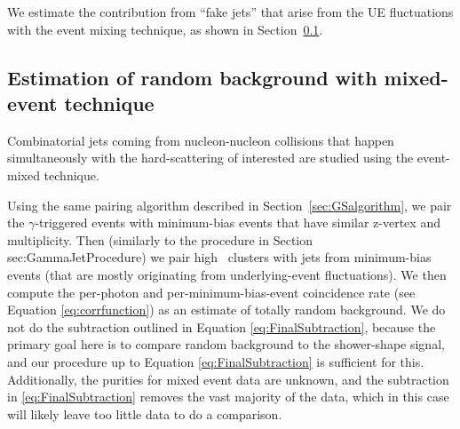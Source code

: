 


\FloatBarrier

We estimate the contribution from ``fake jets'' that arise from the UE fluctuations with the event mixing technique, as shown in Section~\ref{sec:randombkgjets}.

\FloatBarrier
\subsection{Estimation of random background with mixed-event technique}
\label{sec:randombkgjets}
Combinatorial jets coming from nucleon-nucleon collisions that happen simultaneously with the hard-scattering of interested are studied using the event-mixed technique. 

Using the same pairing algorithm described in Section~\ref{sec:GSalgorithm}, we pair the $\gamma$-triggered events with minimum-bias events that have similar z-vertex and multiplicity. Then (similarly to the procedure in Section {sec:GammaJetProcedure}) we pair high \pt~clusters with jets from minimum-bias events (that are mostly originating from underlying-event fluctuations). We then compute the per-photon and per-minimum-bias-event coincidence rate (see Equation \ref{eq:corrfunction}) as an estimate of totally random background. We do not do the subtraction outlined in Equation \ref{eq:FinalSubtraction}, because the primary goal here is to compare random background to the shower-shape signal, and our procedure up to Equation \ref{eq:FinalSubtraction} is sufficient for this. Additionally, the purities for mixed event data are unknown, and the subtraction in \ref{eq:FinalSubtraction} removes the vast majority of the data, which in this case will likely leave too little data to do a comparison.

